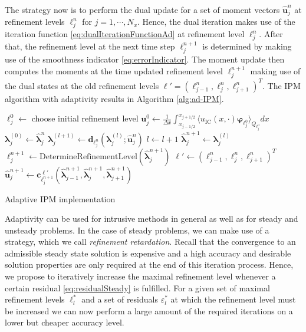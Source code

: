 The strategy now is to perform the dual update for a set of moment vectors $\bm{\hat u}_j^n$ at refinement levels $\ell_j^n$ for $j = 1,\cdots,N_x$. Hence, the dual iteration makes use of the iteration function \eqref{eq:dualIterationFunctionAd} at refinement level $\ell_j^n$. After that, the refinement level at the next time step $\ell_j^{n+1}$ is determined by making use of the smoothness indicator \eqref{eq:errorIndicator}. The moment update then computes the moments at the time updated refinement level $\ell_j^{n+1}$ making use of the dual states at the old refinement levels $\bm{\ell}' = (\ell_{j-1}^n,\ell_{j}^n,\ell_{j+1}^n)^T$. The IPM algorithm with adaptivity results in Algorithm \ref{alg:ad-IPM}.
\begin{algorithm}[H]
\begin{algorithmic}[1]
\State $\ell_j^0 \leftarrow$ choose initial refinement level
\State $\bm{u}_j^0 \leftarrow \frac{1}{\Delta x} \int_{x_{j-1/ 2}}^{x_{j+1/ 2}} \langle u_{\text{IC}}(x, \cdot) \bm{\varphi}_{\ell_j^0} \rangle_{Q_{\ell_j^0}} dx$
\EndFor
{}
\State $\bm{\lambda}_j^{(0)} \leftarrow \bm{\hat \lambda}_j^{n}$
\State $\bm{\lambda}_j^{(l+1)} \leftarrow \bm{d}_{\ell_j^n}(\bm{\lambda}_{j}^{(l)};\bm{\hat u}_j^{n})$
\State $l \leftarrow l+1$
\EndWhile
\State $\bm{\hat \lambda}_j^{n+1} \leftarrow \bm{\lambda}_j^{(l)}$
\State $\ell_j^{n+1}\leftarrow \text{DetermineRefinementLevel}\left(\bm{\hat \lambda}_j^{n+1}\right)$
\EndFor
{}
\State $\bm\ell' \leftarrow (\ell_{j-1}^n,\ell_{j}^n,\ell_{j+1}^n)^T$
\State $\bm{\hat u}_j^{n+1} \leftarrow \bm{c}_{\ell_j^{n+1}}^{\bm\ell'}(\bm{\hat \lambda}_{j-1}^{n+1},\bm{\hat \lambda}_j^{n+1},\bm{\hat \lambda}_{j+1}^{n+1})$
\EndFor
\EndFor
\end{algorithmic}
\caption{Adaptive IPM implementation}
\label{alg:ad-IPM}
\end{algorithm}
Adaptivity can be used for intrusive methods in general as well as for steady and unsteady problems. In the case of steady problems, we can make use of a strategy, which we call \textit{refinement retardation}. Recall that the convergence to an admissible steady state solution is expensive and a high accuracy and desirable solution properties are only required at the end of this iteration process. Hence, we propose to iteratively increase the maximal refinement level whenever a certain residual \eqref{eq:residualSteady} is fulfilled. For a given set of maximal refinement levels $\ell_l^*$ and a set of residuals $\varepsilon_l^*$ at which the refinement level must be increased we can now perform a large amount of the required iterations on a lower but cheaper accuracy level.
